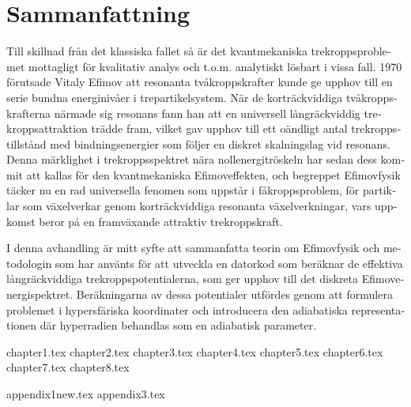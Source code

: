 \documentclass[a4paper,11pt]{book}
\begin{document}
\chapter*{Sammanfattning}
\begin{otherlanguage}{swedish} 
Till skillnad från det klassiska fallet så är det kvantmekaniska trekroppsproblemet mottagligt för kvalitativ analys och t.o.m. analytiskt lösbart i vissa fall. 1970 förutsade Vitaly Efimov att resonanta tvåkroppskrafter kunde ge upphov till en serie bundna energinivåer i trepartikelsystem. När de korträckviddiga tvåkroppskrafterna närmade sig resonans fann han att en universell långräckviddig trekroppsattraktion trädde fram, vilket gav upphov till ett oändligt antal trekroppstillstånd med bindningsenergier som följer en diskret skalningslag vid resonans. Denna märklighet i trekroppsspektret nära nollenergitröskeln har sedan dess kommit att kallas för den kvantmekaniska Efimoveffekten, och begreppet Efimovfysik täcker nu en rad universella fenomen som uppstår i fåkroppsproblem, för partiklar som växelverkar genom korträckviddiga resonanta växelverkningar, vars uppkomst beror på en framväxande attraktiv trekroppskraft.

I denna avhandling är mitt syfte att sammanfatta teorin om Efimovfysik och metodologin som har använts för att utveckla en datorkod som beräknar de effektiva långräckviddiga trekroppspotentialerna, som ger upphov till det diskreta Efimovenergispektret. Beräkningarna av dessa potentialer utfördes genom att formulera problemet i hypersfäriska koordinater och introducera den adiabatiska representationen där hyperradien behandlas som en adiabatisk parameter.
\end{otherlanguage}



\clearpage
\thispagestyle{empty}
 
\tableofcontents
\listoffigures
\listoftables
 
\mainmatter

{chapter1.tex}
{chapter2.tex}
{chapter3.tex}
{chapter4.tex}
{chapter5.tex}
{chapter6.tex}
{chapter7.tex}
{chapter8.tex}

\appendix
{appendix1new.tex}
{appendix3.tex}

 

 
\backmatter


\printbibliography
\end{document}
